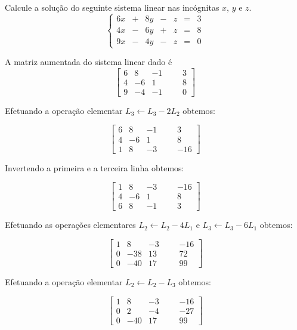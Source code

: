\begin{problem}
Calcule a solução do seguinte sistema linear nas incógnitas $x$, $y$ e $z$.
$$\left\{\begin{array}{rrrrrrr}
 6x & + & 8y & - &  z & = &  3 \\
 4x & - & 6y & + &  z & = &  8 \\
 9x & - & 4y & - &  z & = &  0 \end{array}\right. $$
\end{problem}
\begin{solution}
A matriz aumentada do sistema linear dado é
$$ \left[\begin{array}{rrrr|rr}
	6 &   8 &   -1 & & &   3  \\
	4 &  -6 &    1 & & &   8  \\ 
	9 &  -4 &   -1 & & &   0  \end{array}\right] $$

Efetuando a operação elementar $L_3 \leftarrow L_3 - 2L_2$ obtemos:

$$ \left[\begin{array}{rrrr|rr}
	6 &   8 &   -1 & & &    3  \\
	4 &  -6 &    1 & & &    8  \\ 
	1 &   8 &   -3 & & &  -16  \end{array}\right] $$

Invertendo a primeira e a terceira linha obtemos:

$$ \left[\begin{array}{rrrr|rr}
	1 &   8 &   -3 & & &  -16  \\
	4 &  -6 &    1 & & &    8  \\ 
	6 &   8 &   -1 & & &    3  \end{array}\right] $$

Efetuando as operações elementares $L_2 \leftarrow L_2 - 4L_1$ e $L_3 \leftarrow L_3 - 6L_1$ obtemos:

$$ \left[\begin{array}{rrrr|rr}
	1 &    8 &   -3 & & &  -16  \\
	0 &  -38 &   13 & & &   72  \\ 
	0 &  -40 &   17 & & &   99  \end{array}\right] $$

Efetuando a operação elementar $L_2 \leftarrow L_2 - L_3$ obtemos:

$$ \left[\begin{array}{rrrr|rr}
	1 &    8 &   -3 & & &  -16  \\
	0 &    2 &   -4 & & &  -27  \\ 
	0 &  -40 &   17 & & &   99  \end{array}\right] $$


\end{solution}
